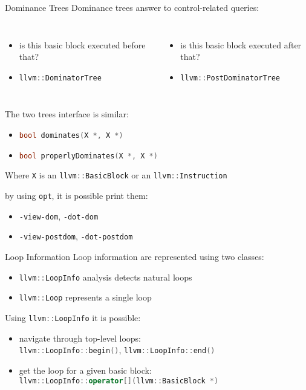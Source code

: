 \documentclass[10pt,mathserif]{beamer}
\newcommand{\cppinline}[1]{\lstinline[language=C++]!#1!}
\begin{document}
\begin{frame}{Dominance Trees}
Dominance trees answer to control-related queries:

\begin{columns}[t]
\begin{itemize}
\item is this basic block executed before that?
\item \cppinline{llvm::DominatorTree}
\end{itemize}

\begin{itemize}
\item is this basic block executed after that?
\item \cppinline{llvm::PostDominatorTree}
\end{itemize}
\end{columns}

\vfill
The two trees interface is similar:

\begin{itemize}
\item \cppinline{bool dominates(X *, X *)}
\item \cppinline{bool properlyDominates(X *, X *)}
\end{itemize}

Where \cppinline{X} is an \cppinline{llvm::BasicBlock} or an
\cppinline{llvm::Instruction}

\vfill
by using \texttt{opt}, it is possible print them:

\begin{itemize}
\item \texttt{-view-dom}, \texttt{-dot-dom}
\item \texttt{-view-postdom}, \texttt{-dot-postdom}
\end{itemize}
\end{frame}

\begin{frame}{Loop Information}
Loop information are represented using two classes:

\begin{itemize}
\item \cppinline{llvm::LoopInfo} analysis detects natural loops
\item \cppinline{llvm::Loop} represents a single loop
\end{itemize}

\vfill
Using \cppinline{llvm::LoopInfo} it is possible:

\begin{itemize}
\item navigate through top-level loops: \\
      \cppinline{llvm::LoopInfo::begin()}, \cppinline{llvm::LoopInfo::end()}
\item get the loop for a given basic block: \\
      \cppinline{llvm::LoopInfo::operator[](llvm::BasicBlock *)}
\end{itemize}
\end{frame}
\end{document}
